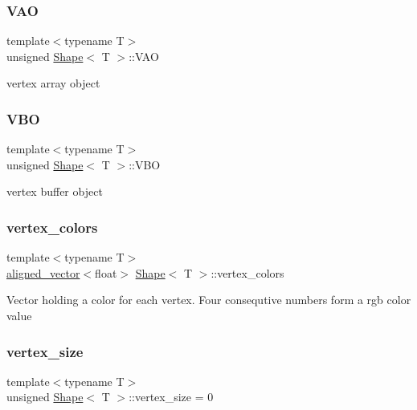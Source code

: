 \subsubsection{\texorpdfstring{V\+AO}{VAO}}
{\footnotesize\ttfamily template$<$typename T$>$ \\
unsigned \mbox{\hyperlink{classShape}{Shape}}$<$ T $>$\+::V\+AO\hspace{0.3cm}{\ttfamily [protected]}}

vertex array object \mbox{\label{classShape_a5ca89aadcd89bb475d6ca88acf733ce6}} 
\subsubsection{\texorpdfstring{V\+BO}{VBO}}
{\footnotesize\ttfamily template$<$typename T$>$ \\
unsigned \mbox{\hyperlink{classShape}{Shape}}$<$ T $>$\+::V\+BO\hspace{0.3cm}{\ttfamily [protected]}}

vertex buffer object \mbox{\label{classShape_a1590ef02d7090f28d1ad312fd46f5030}} 
\subsubsection{\texorpdfstring{vertex\+\_\+colors}{vertex\_colors}}
{\footnotesize\ttfamily template$<$typename T$>$ \\
\mbox{\hyperlink{type__definitions_8hpp_a087efd587d66b881646ef378f1919c90}{aligned\+\_\+vector}}$<$float$>$ \mbox{\hyperlink{classShape}{Shape}}$<$ T $>$\+::vertex\+\_\+colors\hspace{0.3cm}{\ttfamily [protected]}}

Vector holding a color for each vertex. Four consequtive numbers form a rgb color value \mbox{\label{classShape_a7cf9cc243cdd64215eca4d81704c7199}} 
\subsubsection{\texorpdfstring{vertex\+\_\+size}{vertex\_size}}
{\footnotesize\ttfamily template$<$typename T$>$ \\
unsigned \mbox{\hyperlink{classShape}{Shape}}$<$ T $>$\+::vertex\+\_\+size = 0\hspace{0.3cm}{\ttfamily [protected]}}

